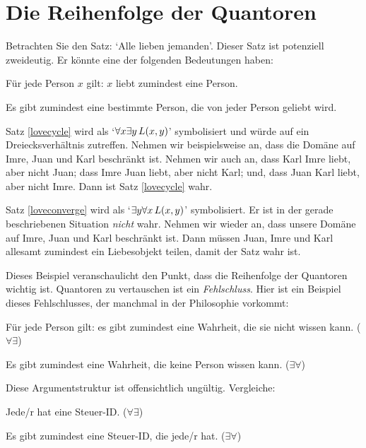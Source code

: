 \section{Die Reihenfolge der Quantoren}\label{ss:OrderQuant}
Betrachten Sie den Satz: `Alle lieben jemanden'. Dieser Satz ist potenziell zweideutig. Er könnte eine der folgenden Bedeutungen haben:
	\begin{earg}
		\item[\ex{lovecycle}] Für jede Person $x$ gilt: $x$ liebt zumindest eine Person.
		\item[\ex{loveconverge}] Es gibt zumindest eine bestimmte Person, die von jeder Person geliebt wird.
	\end{earg}
Satz \ref{lovecycle} wird als `$\forall x \exists y\, \mathord{L}(x,y)$' symbolisiert und würde auf ein Dreiecksverhältnis zutreffen. Nehmen wir beispielsweise an, dass die Domäne auf Imre, Juan und Karl beschränkt ist. Nehmen wir auch an, dass Karl Imre liebt, aber nicht Juan; dass Imre Juan liebt, aber nicht Karl; und, dass Juan Karl liebt, aber nicht Imre. Dann ist Satz \ref{lovecycle} wahr. 

Satz \ref{loveconverge} wird als `$\exists y \forall x\, \mathord{L}(x,y)$' symbolisiert. Er ist in der gerade beschriebenen Situation \emph{nicht} wahr. Nehmen wir wieder an, dass unsere Domäne auf Imre, Juan und Karl beschränkt ist. Dann müssen Juan, Imre und Karl allesamt zumindest ein Liebesobjekt teilen, damit der Satz wahr ist. 

Dieses Beispiel veranschaulicht den Punkt, dass die Reihenfolge der Quantoren wichtig ist. Quantoren zu vertauschen ist ein \emph{Fehlschluss}. Hier ist ein Beispiel dieses Fehlschlusses, der manchmal in der Philosophie vorkommt:
	\begin{earg}
		\item[] Für jede Person gilt: es gibt zumindest eine Wahrheit, die sie nicht wissen kann. \hfill ($\forall \exists$)
		\item[\therefore] Es gibt zumindest eine Wahrheit, die keine Person wissen kann. \hfill ($\exists \forall$)
	\end{earg}
Diese Argumentstruktur ist offensichtlich ungültig. Vergleiche:
	\begin{earg}
		\item[] Jede/r hat eine Steuer-ID. \hfill ($\forall \exists$)
		\item[\therefore] Es gibt zumindest eine Steuer-ID, die jede/r hat. \hfill ($\exists \forall$)
	\end{earg}

